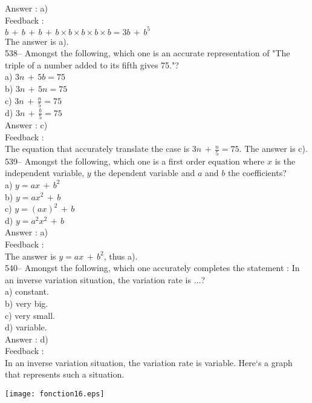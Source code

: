 \documentclass[letterpaper, 12pt]{article}
\begin{document}
Answer : a)\\

Feedback : \\
$b\,+\,b\,+\,b\,+\,b\times b\times b \times b \times b= 3b\,+\,b^{5}$\\
The answer is a).\\

538-- 
Amongst the following, which one is an accurate representation of "The triple of a number added to its fifth gives 75."?\\
a) $3n\,+\,5b=75$\\[2mm]
b) $3n\,+\,5n=75$\\[2mm]
c) $3n\,+\,\frac{n}{5}=75$\\[2mm]
d) $3n\,+\,\frac{b}{5}=75$\\

Answer : c)\\

Feedback : \\
The equation that accurately translate the case is $3n\,+\,\frac{n}{5}=75$.
The answer is c).\\


539-- Amongst the following, which one is a first order equation where $x$ is the independent variable, $y$ the dependent variable and $a$ and $b$ the coefficients?\\
a) $y=ax\,+\,b^{2}$ \\
b) $y=ax^{2}\,+\,b$\\
c) $y=\left( ax\right) ^{2}\,+\,b$\\
d) $y=a^{2}x^{2}\,+\,b$\\

Answer : a)\\

Feedback : \\
The answer is $y=ax\,+\,b^{2}$, thus a). \\

540-- Amongst the following, which one accurately completes the statement : \og In an inverse variation situation, the variation rate is $\ldots$\fg ?\\
a) constant.\\
b) very big.\\
c) very small.\\
d) variable.\\

Answer : d)\\

Feedback : \\
In an inverse variation situation, the variation rate is variable.
Here`s a graph that represents such a situation.\\
    \begin{center}
    \texttt{[image: fonction16.eps]}
    \end{center}
\end{document}
